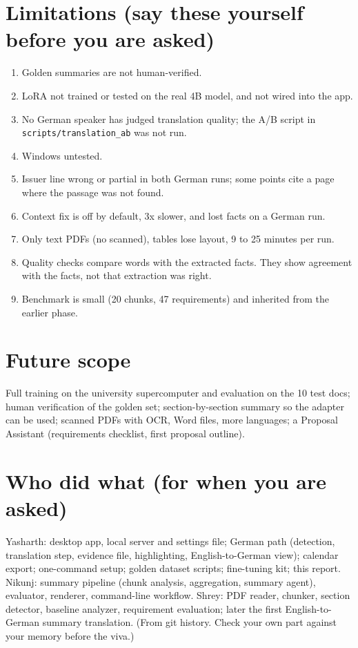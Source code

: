 \section{Limitations (say these yourself before you are asked)}
\begin{enumerate}
\item Golden summaries are not human-verified.
\item LoRA not trained or tested on the real 4B model, and not wired into the app.
\item No German speaker has judged translation quality; the A/B script in \texttt{scripts/translation\_ab} was not run.
\item Windows untested.
\item Issuer line wrong or partial in both German runs; some points cite a page where the passage was not found.
\item Context fix is off by default, 3x slower, and lost facts on a German run.
\item Only text PDFs (no scanned), tables lose layout, 9 to 25 minutes per run.
\item Quality checks compare words with the extracted facts. They show agreement with the facts, not that extraction was right.
\item Benchmark is small (20 chunks, 47 requirements) and inherited from the earlier phase.
\end{enumerate}

\section{Future scope}
Full training on the university supercomputer and evaluation on the 10 test docs; human verification of the golden set; section-by-section summary so the adapter can be used; scanned PDFs with OCR, Word files, more languages; a Proposal Assistant (requirements checklist, first proposal outline).

\section{Who did what (for when you are asked)}
Yasharth: desktop app, local server and settings file; German path (detection, translation step, evidence file, highlighting, English-to-German view); calendar export; one-command setup; golden dataset scripts; fine-tuning kit; this report. Nikunj: summary pipeline (chunk analysis, aggregation, summary agent), evaluator, renderer, command-line workflow. Shrey: PDF reader, chunker, section detector, baseline analyzer, requirement evaluation; later the first English-to-German summary translation. (From git history. Check your own part against your memory before the viva.)

